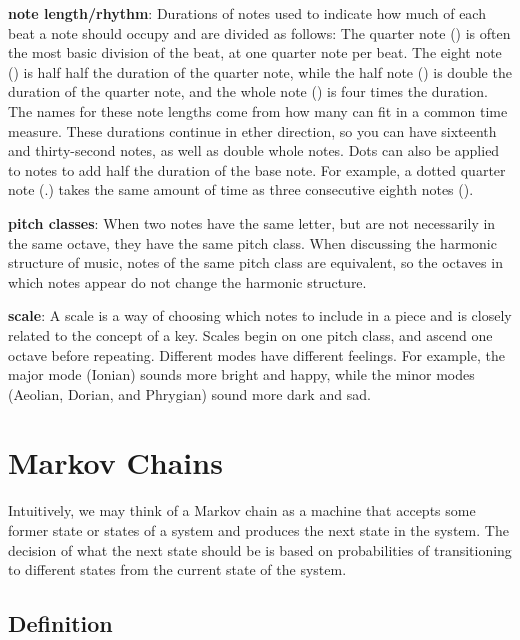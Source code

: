 \textbf{note length/rhythm}: Durations of notes used to indicate how much of each beat a note should occupy and are divided as follows:
The quarter note (\quarternote) is often the most basic division of the beat, at one quarter note per beat.
The eight note (\eighthnote) is half half the duration of the quarter note, while the half note (\halfnote) is double the duration of the quarter note, and the whole note (\fullnote) is four times the duration.
The names for these note lengths come from how many can fit in a common time measure.
These durations continue in ether direction, so you can have sixteenth and thirty-second notes, as well as double whole notes.
Dots can also be applied to notes to add half the duration of the base note.
For example, a dotted quarter note (\quarternote.) takes the same amount of time as three consecutive eighth notes (\eighthnote \eighthnote \eighthnote).


\textbf{pitch classes}: When two notes have the same letter, but are not necessarily in the same octave, they have the same pitch class.
When discussing the harmonic structure of music, notes of the same pitch class are equivalent, so the octaves in which notes appear do not change the harmonic structure.

\textbf{scale}: A scale is a way of choosing which notes to include in a piece and is closely related to the concept of a key.
Scales begin on one pitch class, and ascend one octave before repeating.
Different modes have different feelings.
For example, the major mode (Ionian) sounds more bright and happy, while the minor modes (Aeolian, Dorian, and Phrygian) sound more dark and sad.

\section[Markov Chains]{Markov Chains} \label{bg:markov}

Intuitively, we may think of a Markov chain as a machine that accepts some former state or states of a system and produces the next state in the system.
The decision of what the next state should be is based on probabilities of transitioning to different states from the current state of the system.

\subsection{Definition} \label{bg:markov:definitions}

